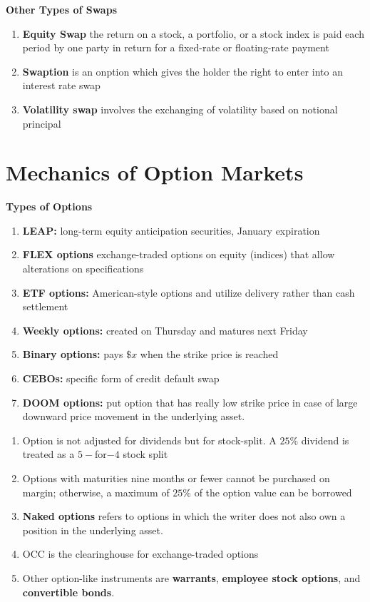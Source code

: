 \documentclass[11pt,fleqn]{report} %
\numberwithin{equation}{section} %
\numberwithin{figure}{section} %
\numberwithin{table}{section} %
\begin{document}
\begin{definition}\textbf{Other Types of Swaps}
\begin{enumerate}
    \item \textbf{Equity Swap} the return on a stock, a portfolio, or a stock index is paid each period by one party in return for a fixed-rate or floating-rate payment
    \item \textbf{Swaption} is an onption which gives the holder the right to enter into an interest rate swap
    \item \textbf{Volatility swap} involves the exchanging of volatility based on notional principal
\end{enumerate}
\end{definition}
\chapter{Mechanics of Option Markets}
\begin{definition}\textbf{Types of Options}
\begin{enumerate}
    \item \textbf{LEAP:} long-term equity anticipation securities, January expiration 
    \item \textbf{FLEX options} exchange-traded options on equity (indices) that allow alterations on specifications
    \item \textbf{ETF options:} American-style options and utilize delivery rather than cash settlement
    \item \textbf{Weekly options:} created on Thursday and matures next Friday
    \item \textbf{Binary options:} pays $\$x$ when the strike price is reached
    \item \textbf{CEBOs:} specific form of credit default swap
    \item \textbf{DOOM options:} put option that has really low strike price in case of large downward price movement in the underlying asset.
\end{enumerate}
\end{definition}
\begin{remark}
\begin{enumerate}
    \item Option is not adjusted for dividends but for stock-split. A $25\%$ dividend is treated as a $5-$for$-4$ stock split
    \item Options with maturities nine months or fewer cannot be purchased on margin; otherwise, a maximum of $25\%$ of the option value can be borrowed
    \item \textbf{Naked options} refers to options in which the writer does not also own a position in the underlying asset.
    \item OCC is the clearinghouse for exchange-traded options
    \item Other option-like instruments are \textbf{warrants}, \textbf{employee stock options}, and \textbf{convertible bonds}.
\end{enumerate}

\end{remark}
\end{document}
